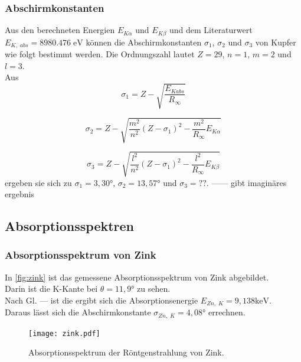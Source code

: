 \subsubsection*{Abschirmkonstanten}

Aus den berechneten Energien $E_{K \alpha}$ und $E_{K \beta}$ und dem Literaturwert $E_{K,\;abs} = 8980.476 \; \mathrm{eV}$ können die 
Abschirmkonstanten $\sigma_1$, $\sigma_2$ und $\sigma_3$ von Kupfer wie folgt bestimmt werden. Die Ordnungszahl lautet $Z = 29$, $n=1$, $m=2$ und $l=3$. \\
Aus 
\begin{equation*}
  \sigma_1=Z-\sqrt{\frac{E_{Kabs}}{R_\infty}}
  \end{equation*}
  
  \begin{equation*}
  \sigma_2=Z-\sqrt{ \frac{m^2}{n^2}(Z-\sigma_1)^2 - \frac{m^2}{R_\infty} E_{K\alpha}}
  \end{equation*}
  
  \begin{equation*}
      \sigma_3=Z-\sqrt{ \frac{l^2}{n^2}(Z-\sigma_1)^2 - \frac{l^2}{R_\infty} E_{K\beta}}
  \end{equation*}
ergeben sie sich zu $\sigma_1 = 3,30°$, $\sigma_2 = 13,57°$ 
und $\sigma_3 = ??$. ------ gibt imaginäres ergebnis




\subsection{Absorptionsspektren}
\label{subsec:absorptionsspektrum}


\subsubsection*{Absorptionsspektrum von Zink}
In \autoref{fig:zink} ist das gemessene Absorptionsspektrum von Zink abgebildet.\\
Darin ist die K-Kante bei $\theta = 11,9°$ zu sehen. \\
Nach Gl. --- ist die ergibt sich die Absorptionsenergie $E_{Zn, \; K} = 9,138 \mathrm{ keV}$.\\
Daraus lässt sich die Abschirmkonstante $\sigma_{Zn, \; K} = 4,08°$ errechnen.
\begin{figure}
  \centering
  \texttt{[image: zink.pdf]}
  \caption{Absorptionsspektrum der Röntgenstrahlung von Zink.}
  \label{fig:zink}
\end{figure}



